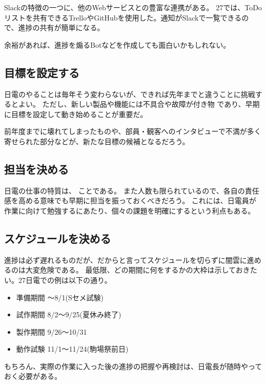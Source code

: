 \documentclass[letterpaper,10pt,dvipdfmx]{sphinxmanual}
\begin{document}
Slackの特徴の一つに、他のWebサービスとの豊富な連携がある。
27では、ToDoリストを共有できるTrelloやGitHubを使用した。通知がSlackで一覧できるので、進捗の共有が簡単になる。

余裕があれば、進捗を煽るBotなどを作成しても面白いかもしれない。


\subsection{目標を設定する}
\label{\detokenize{management:id5}}
日電のやることは毎年そう変わらないが、できれば先年までと違うことに挑戦するとよい。
ただし、新しい製品や機能には不具合や故障が付き物
であり、早期に目標を設定して動き始めることが重要だ。

前年度までに壊れてしまったものや、部員・観客へのインタビューで不満が多く寄せられた部分などが、新たな目標の候補となるだろう。


\subsection{担当を決める}
\label{\detokenize{management:id6}}
日電の仕事の特質は、
ことである。
また人数も限られているので、各自の責任感を高める意味でも早期に担当を振っておくべきだろう。
これには、日電員が作業に向けて勉強するにあたり、個々の課題を明確にするという利点もある。


\subsection{スケジュールを決める}
\label{\detokenize{management:id7}}
進捗は必ず遅れるものだが、だからと言ってスケジュールを切らずに闇雲に進めるのは大変危険である。
最低限、どの期間に何をするかの大枠は示しておきたい。27日電での例は以下の通り。
\begin{itemize}
\item {} 
準備期間 〜8/1(Sセメ試験)

\item {} 
試作期間 8/2〜9/25(夏休み終了)

\item {} 
製作期間 9/26〜10/31

\item {} 
動作試験 11/1〜11/24(駒場祭前日)

\end{itemize}

もちろん、実際の作業に入った後の進捗の把握や再検討は、日電長が随時やっておく必要がある。
\end{document}
